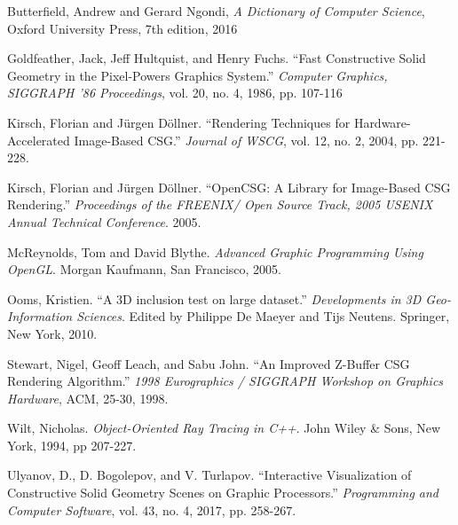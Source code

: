 \documentclass[12pt]{article}
\begin{document}
\begin{onehalfspace}
\newpage
\begin{thebibliography}{10}
  Butterfield, Andrew and Gerard Ngondi,
  \textit{A Dictionary of Computer Science},
  Oxford University Press,
  7th edition,
  2016

  Goldfeather, Jack, Jeff Hultquist, and Henry Fuchs. ``Fast Constructive Solid Geometry in the Pixel-Powers Graphics System.'' {\it Computer Graphics, SIGGRAPH '86 Proceedings}, vol. 20, no. 4, 1986,
pp. 107-116
  
  Kirsch, Florian and J\"{u}rgen D\"{o}llner. ``Rendering Techniques for Hardware-Accelerated Image-Based CSG.'' {\it Journal of WSCG}, vol. 12, no. 2, 2004, pp. 221-228.

  Kirsch, Florian and J\"{u}rgen D\"{o}llner. ``OpenCSG: A Library for Image-Based CSG Rendering.'' {\it Proceedings of the FREENIX/ Open Source Track, 2005 USENIX Annual Technical Conference}. 2005.

  McReynolds, Tom and David Blythe. {\it Advanced Graphic Programming Using OpenGL}. Morgan Kaufmann, San Francisco, 2005.

  Ooms, Kristien. ``A 3D inclusion test on large dataset.'' {\it Developments in 3D Geo-Information Sciences}. Edited by Philippe De Maeyer and Tijs Neutens. Springer, New York, 2010.

  Stewart, Nigel, Geoff Leach, and Sabu John. ``An Improved Z-Buffer CSG Rendering Algorithm.'' {\it 1998 Eurographics / SIGGRAPH Workshop on Graphics Hardware}, ACM, 25-30, 1998.

  Wilt, Nicholas. {\it Object-Oriented Ray Tracing in C++}. John Wiley \& Sons, New York, 1994, pp 207-227.

  Ulyanov, D., D. Bogolepov, and V. Turlapov. ``Interactive Visualization of Constructive Solid Geometry Scenes on Graphic Processors.'' {\it Programming and Computer Software}, vol. 43, no. 4, 2017, pp. 258-267.
\end{thebibliography}
\end{onehalfspace}
\end{document}

